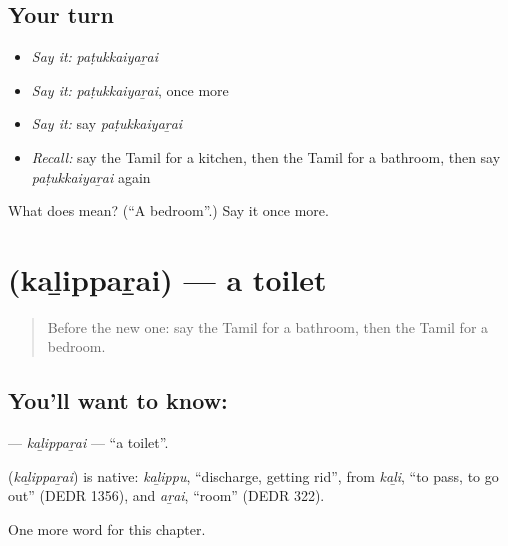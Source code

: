 \subsection*{Your turn}
\begin{itemize}
\raggedright
  \item \emph{Say it:} \emph{paṭukkaiyaṟai}
  \item \emph{Say it:} \emph{paṭukkaiyaṟai}, once more
  \item \emph{Say it:} say \emph{paṭukkaiyaṟai}
  \item \emph{Recall:} say the Tamil for a kitchen, then the Tamil for a bathroom, then say \emph{paṭukkaiyaṟai} again
\end{itemize}

\begin{tcolorbox}[breakable,colback=teal!4,colframe=teal!35!black,title={Before you move on}]
What does  mean? (\textquotedblleft{}A bedroom\textquotedblright{}.) Say it once more.
\end{tcolorbox}
\section[\texorpdfstring{\ta{கழிப்பறை} (kaḻippaṟai)}{கழிப்பறை (kaḻippaṟai)}]{ (kaḻippaṟai) — a toilet}

\label{lesson:TA-C173-kalipparai}



\begin{quote}
Before the new one: say the Tamil for a bathroom, then the Tamil for a bedroom.
\end{quote}

\subsection*{You'll want to know: }
\textbf{} — \emph{kaḻippaṟai} — \textquotedblleft{}a toilet\textquotedblright{}.

\begin{cousinweb}
\textbf{} (\emph{kaḻippaṟai}) is native: \emph{kaḻippu}, \textquotedblleft{}discharge, getting rid\textquotedblright{}, from \emph{kaḻi}, \textquotedblleft{}to pass, to go out\textquotedblright{} (DEDR 1356), and \emph{aṟai}, \textquotedblleft{}room\textquotedblright{} (DEDR 322).
\end{cousinweb}

\begin{grammarlens}[title={What you've built}]
One more word for this chapter.
\end{grammarlens}

